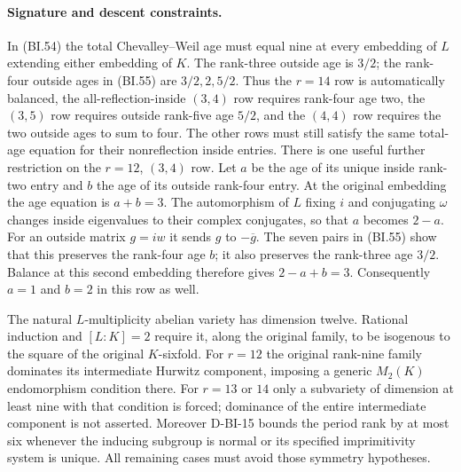 \paragraph{Signature and descent constraints.}
In (BI.54) the total Chevalley--Weil age must equal nine at every
embedding of $L$ extending either embedding of $K$.
The rank-three outside age is $3/2$; the rank-four outside
ages in (BI.55) are $3/2,2,5/2$.  Thus the $r=14$ row is
automatically balanced, the all-reflection-inside $(3,4)$ row
requires rank-four age two, the $(3,5)$ row requires outside
rank-five age $5/2$, and the $(4,4)$ row requires the two
outside ages to sum to four.  The other rows must still satisfy
the same total-age equation for their nonreflection inside entries.
There is one useful further restriction on the $r=12$, $(3,4)$
row.  Let $a$ be the age of its unique inside rank-two entry and
$b$ the age of its outside rank-four entry.  At the original
embedding the age equation is $a+b=3$.  The automorphism of $L$
fixing $i$ and conjugating $\omega$ changes inside eigenvalues
to their complex conjugates, so that $a$ becomes $2-a$.
For an outside matrix $g=iw$ it sends $g$ to $-\overline g$.
The seven pairs in (BI.55) show that this preserves the
rank-four age $b$; it also preserves the rank-three age $3/2$.
Balance at this second embedding therefore gives $2-a+b=3$.
Consequently $a=1$ and $b=2$ in this row as well.

The natural $L$-multiplicity abelian variety has dimension twelve.
Rational induction and $[L:K]=2$ require it, along the original
family, to be isogenous to the square of the original $K$-sixfold.
For $r=12$ the original rank-nine family dominates its intermediate
Hurwitz component, imposing a generic $M_2(K)$ endomorphism
condition there.  For $r=13$ or $14$ only a subvariety of
dimension at least nine with that condition is forced; dominance
of the entire intermediate component is not asserted.
Moreover D-BI-15 bounds the period rank by at most six whenever
the inducing subgroup is normal or its specified imprimitivity
system is unique.  All remaining cases must avoid those symmetry
hypotheses.

